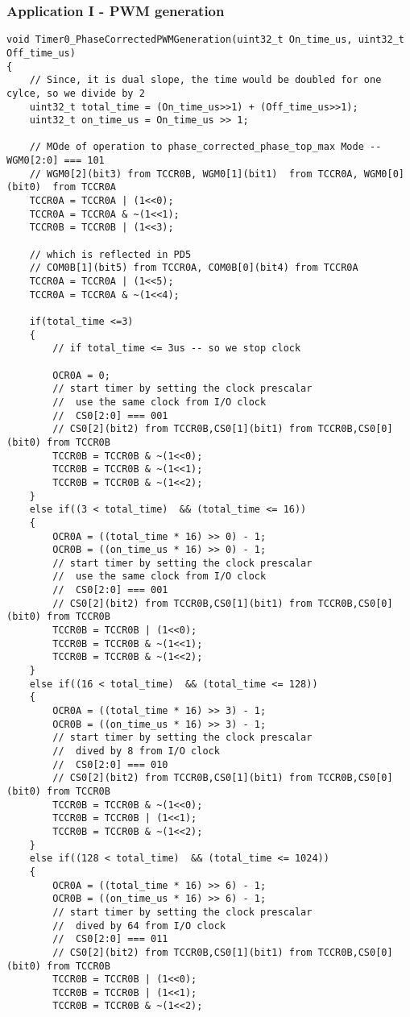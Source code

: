 \subsubsection{Application I - PWM generation}
\begin{verbatim}
void Timer0_PhaseCorrectedPWMGeneration(uint32_t On_time_us, uint32_t Off_time_us)
{
	// Since, it is dual slope, the time would be doubled for one cylce, so we divide by 2
	uint32_t total_time = (On_time_us>>1) + (Off_time_us>>1);
	uint32_t on_time_us = On_time_us >> 1;
		
	// MOde of operation to phase_corrected_phase_top_max Mode -- WGM0[2:0] === 101
	// WGM0[2](bit3) from TCCR0B, WGM0[1](bit1)  from TCCR0A, WGM0[0](bit0)  from TCCR0A
	TCCR0A = TCCR0A | (1<<0);
	TCCR0A = TCCR0A & ~(1<<1);
	TCCR0B = TCCR0B | (1<<3);	

	// which is reflected in PD5
	// COM0B[1](bit5) from TCCR0A, COM0B[0](bit4) from TCCR0A
	TCCR0A = TCCR0A | (1<<5);
	TCCR0A = TCCR0A & ~(1<<4);
	
	if(total_time <=3)
	{
		// if total_time <= 3us -- so we stop clock
		
		OCR0A = 0;
		// start timer by setting the clock prescalar
		//  use the same clock from I/O clock
		//  CS0[2:0] === 001
		// CS0[2](bit2) from TCCR0B,CS0[1](bit1) from TCCR0B,CS0[0](bit0) from TCCR0B
		TCCR0B = TCCR0B & ~(1<<0);
		TCCR0B = TCCR0B & ~(1<<1);
		TCCR0B = TCCR0B & ~(1<<2);
	}
	else if((3 < total_time)  && (total_time <= 16))
	{
		OCR0A = ((total_time * 16) >> 0) - 1;
		OCR0B = ((on_time_us * 16) >> 0) - 1;
		// start timer by setting the clock prescalar
		//  use the same clock from I/O clock
		//  CS0[2:0] === 001
		// CS0[2](bit2) from TCCR0B,CS0[1](bit1) from TCCR0B,CS0[0](bit0) from TCCR0B
		TCCR0B = TCCR0B | (1<<0);
		TCCR0B = TCCR0B & ~(1<<1);
		TCCR0B = TCCR0B & ~(1<<2);
	}
	else if((16 < total_time)  && (total_time <= 128))
	{
		OCR0A = ((total_time * 16) >> 3) - 1;
		OCR0B = ((on_time_us * 16) >> 3) - 1;
		// start timer by setting the clock prescalar
		//  dived by 8 from I/O clock
		//  CS0[2:0] === 010
		// CS0[2](bit2) from TCCR0B,CS0[1](bit1) from TCCR0B,CS0[0](bit0) from TCCR0B
		TCCR0B = TCCR0B & ~(1<<0);
		TCCR0B = TCCR0B | (1<<1);
		TCCR0B = TCCR0B & ~(1<<2);
	}
	else if((128 < total_time)  && (total_time <= 1024))
	{
		OCR0A = ((total_time * 16) >> 6) - 1;
		OCR0B = ((on_time_us * 16) >> 6) - 1;
		// start timer by setting the clock prescalar
		//  dived by 64 from I/O clock
		//  CS0[2:0] === 011
		// CS0[2](bit2) from TCCR0B,CS0[1](bit1) from TCCR0B,CS0[0](bit0) from TCCR0B
		TCCR0B = TCCR0B | (1<<0);
		TCCR0B = TCCR0B | (1<<1);
		TCCR0B = TCCR0B & ~(1<<2);
		

\end{verbatim}

